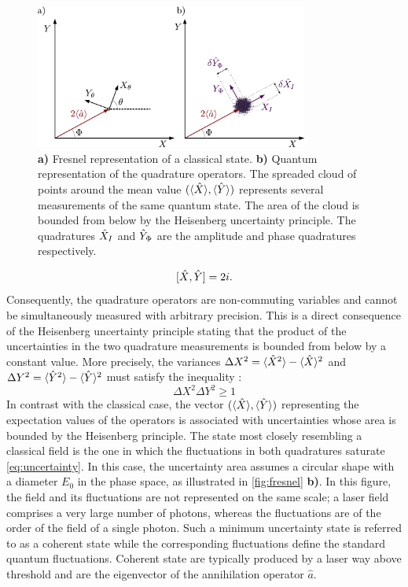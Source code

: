 \begin{figure}
    \centering
    \includegraphics[width=0.8\textwidth]{chap_correlation/fig/fresnel.pdf}
    \caption{ \textbf{a)} Fresnel representation of a classical state. \textbf{b)} Quantum representation 
    of the quadrature operators. The spreaded cloud of points around the mean value $(\langle \hat{X} \rangle, \langle \hat{Y} \rangle)$ represents several measurements of the same quantum state. The area of the cloud 
    is bounded from below by the Heisenberg uncertainty principle. The quadratures $\hat{X}_{I}$ and $\hat{Y}_{\Phi}$ are the amplitude and phase quadratures respectively.}
    \label{fig:fresnel}
\end{figure}


\begin{equation}
    \label{eq:commut}
    [\hat{X},\hat{Y}] = 2i.
\end{equation}
Consequently, the quadrature operators are non-commuting variables and cannot be simultaneously measured with arbitrary precision. This is a direct consequence of the Heisenberg uncertainty principle stating that the product of the uncertainties in the two quadrature measurements is bounded from below by a constant value.
More precisely, the variances $\Delta X^2 = \langle \hat{X}^2 \rangle - \langle \hat{X} \rangle^2$ and $\Delta Y^2 = \langle \hat{Y}^2 \rangle - \langle \hat{Y} \rangle^2$ must satisfy the inequality :
\begin{equation}
    \label{eq:uncertainty}
    \Delta X^2 \Delta Y^2 \geq 1
\end{equation}
In contrast with the classical case, the vector $(\langle \hat{X} \rangle, \langle \hat{Y} \rangle)$ representing the expectation values of the operators is associated with uncertainties whose area is bounded by the Heisenberg principle. 
The state most closely resembling a classical field is the one in which the fluctuations in both quadratures saturate \autoref{eq:uncertainty}. In this case, the uncertainty area assumes a circular shape with a diameter $E_0$ in the phase space, as illustrated in \autoref{fig:fresnel} \textbf{b)}. In this figure, the field and its fluctuations are not represented on the same scale; a laser field comprises a very large number of photons, whereas the fluctuations are of the order of the field of a single photon. 
Such a minimum uncertainty state is referred to as a coherent state while the corresponding fluctuations define the standard quantum fluctuations. Coherent
state are typically produced by a laser way above threshold and are the eigenvector of the annihilation operator $\hat{a}$.

